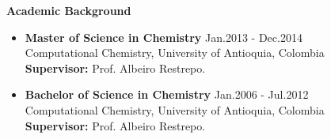 {\bf\Large Academic \textcolor{my_blue}{Background}}\\ \vspace*{-6mm}

\begin{itemize}
    \item {\bf Master of Science in Chemistry}\hfill
          \textcolor{my_blue}{Jan.2013 - Dec.2014}\\
          Computational Chemistry, University of Antioquia, Colombia\\
          {\bf Supervisor:} Prof. Albeiro Restrepo.

    \item {\bf Bachelor of Science in Chemistry}\hfill
          \textcolor{my_blue}{Jan.2006 - Jul.2012}\\
          Computational Chemistry, University of Antioquia, Colombia\\
          {\bf Supervisor:} Prof. Albeiro Restrepo.

\end{itemize}



%
%
%
%
%
